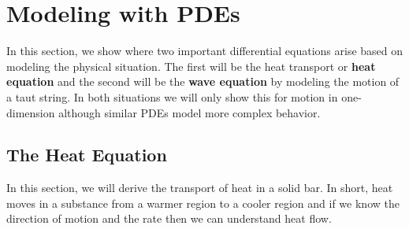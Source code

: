 %

\section{Modeling with PDEs} \label{sect:modeling:pdes}

In this section, we show where two important differential equations arise based on modeling the physical situation.
The first will be the heat transport or \textbf{heat equation} and the second will be the \textbf{wave equation} by
modeling the motion of a taut string.  In both situations we will only show this for motion in one-dimension although
similar PDEs model more complex behavior.

\subsection{The Heat Equation}

In this section, we will derive the transport of heat in a solid bar.
In short, heat moves in a substance from a warmer region to a cooler region and
if we know the direction of motion and the rate then we can understand heat flow.

